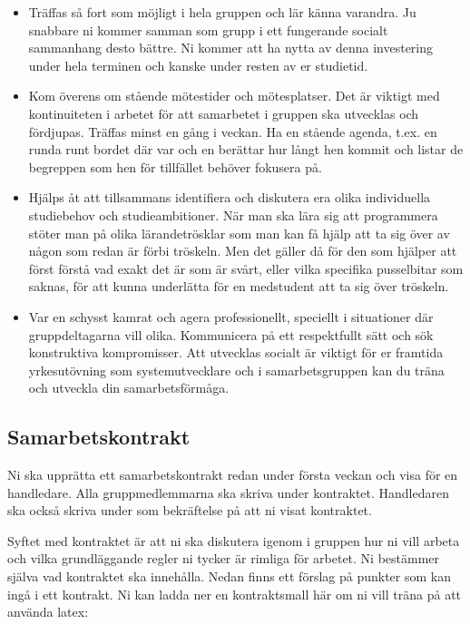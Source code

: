 \begin{itemize}
\item Träffas så fort som möjligt i hela gruppen och lär känna varandra. Ju snabbare ni kommer samman som grupp i ett fungerande socialt sammanhang desto bättre. Ni kommer att ha nytta av denna investering under hela terminen och kanske under resten av er studietid. 
\item Kom överens om stående mötestider och mötesplatser. Det är viktigt med kontinuiteten i arbetet för att samarbetet i gruppen ska utvecklas och fördjupas. Träffas minst en gång i veckan. Ha en stående agenda, t.ex. en runda runt bordet där var och en berättar hur långt hen kommit och listar de begreppen som hen för tillfället behöver fokusera på. 
\item Hjälps åt att tillsammans identifiera och diskutera era olika individuella studiebehov och studieambitioner. När man ska lära sig att programmera stöter man på olika lärandetrösklar som man kan få hjälp att ta sig över av någon som redan är förbi tröskeln. Men det gäller då för den som hjälper att först förstå vad exakt det är som är svårt, eller vilka specifika pusselbitar som saknas, för att kunna underlätta för en medstudent att ta sig över tröskeln.
\item Var en schysst kamrat och agera professionellt, speciellt i situationer där gruppdeltagarna vill olika. Kommunicera på ett respektfullt sätt och sök konstruktiva kompromisser. Att utvecklas socialt är viktigt för er framtida yrkesutövning som systemutvecklare och i samarbetsgruppen kan du träna och utveckla din samarbetsförmåga.
\end{itemize}

\subsection*{Samarbetskontrakt}

Ni ska upprätta ett samarbetskontrakt redan under första veckan och visa för en handledare. Alla gruppmedlemmarna ska skriva under kontraktet. Handledaren ska också skriva under som bekräftelse på att ni visat kontraktet. 

Syftet med kontraktet är att ni ska diskutera igenom i gruppen hur ni vill arbeta och vilka grundläggande regler ni tycker är rimliga för arbetet. Ni bestämmer själva vad kontraktet ska innehålla. Nedan finns ett förslag på punkter som kan ingå i ett kontrakt. Ni kan ladda ner en kontraktsmall här om ni vill träna på att använda latex: \url{} 

